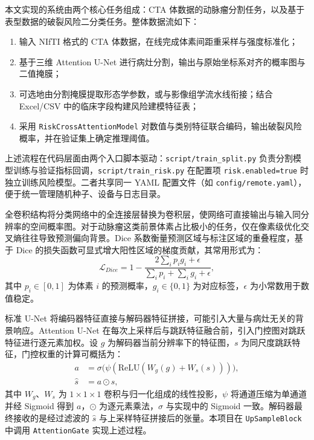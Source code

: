 
本文实现的系统由两个核心任务组成：CTA 体数据的动脉瘤分割任务，以及基于表型数据的破裂风险二分类任务。整体数据流如下：
\begin{enumerate}
	\item 输入 NIfTI 格式的 CTA 体数据，在线完成体素间距重采样与强度标准化；
	\item 基于三维 Attention U-Net 进行病灶分割，输出与原始坐标系对齐的概率图与二值掩膜；
	\item 可选地由分割掩膜提取形态学参数，或与影像组学流水线衔接；结合 Excel/CSV 中的临床字段构建风险建模特征表；
	\item 采用 \texttt{RiskCrossAttentionModel} 对数值与类别特征联合编码，输出破裂风险概率，并在验证集上确定推理阈值。
\end{enumerate}

上述流程在代码层面由两个入口脚本驱动：\texttt{script/train\_split.py} 负责分割模型训练与验证指标回调，\texttt{script/train\_risk.py} 在配置项 \texttt{risk.enabled=true} 时独立训练风险模型。二者共享同一 YAML 配置文件（如 \texttt{config/remote.yaml}），便于统一管理随机种子、设备与日志目录。

全卷积结构将分类网络中的全连接层替换为卷积层，使网络可直接输出与输入同分辨率的空间概率图\cite{long2015,unet}。对于动脉瘤这类前景体素占比极小的任务，仅在像素级优化交叉熵往往导致预测偏向背景。Dice 系数衡量预测区域与标注区域的重叠程度，基于 Dice 的损失函数可显式增大阳性区域的梯度贡献，其常用形式为：
\begin{equation}
\mathcal{L}_{Dice}=1-\frac{2\sum_{i}p_i g_i+\epsilon}{\sum_i p_i+\sum_i g_i+\epsilon},
\end{equation}
其中 $p_i\in[0,1]$ 为体素 $i$ 的预测概率，$g_i\in\{0,1\}$ 为对应标签，$\epsilon$ 为小常数用于数值稳定。

标准 U-Net 将编码器特征直接与解码器特征拼接，可能引入大量与病灶无关的背景响应。Attention U-Net 在每次上采样后与跳跃特征融合前，引入门控图对跳跃特征进行逐元素加权\cite{attention_unet}。设 $g$ 为解码器当前分辨率下的特征图，$s$ 为同尺度跳跃特征，门控权重的计算可概括为：
\begin{align}
a &= \sigma\bigl(\psi(\mathrm{ReLU}(W_g(g)+W_s(s)))\bigr), \\
\hat{s} &= a \odot s,
\end{align}
其中 $W_g$、$W_s$ 为 $1\times1\times1$ 卷积与归一化组成的线性投影，$\psi$ 将通道压缩为单通道并经 Sigmoid 得到 $a$，$\odot$ 为逐元素乘法，$\sigma$ 与实现中的 Sigmoid 一致。解码器最终接收的是经过滤波的 $\hat{s}$ 与上采样特征拼接后的张量。本项目在 \texttt{UpSampleBlock} 中调用 \texttt{AttentionGate} 实现上述过程。

